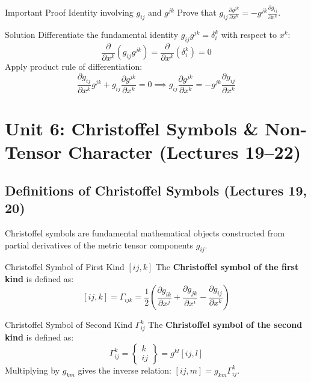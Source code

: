 \documentclass[11pt,a4paper]{article}
\begin{document}
\begin{examplebox}{\texorpdfstring{Important Proof Identity involving $g_{ij}$ and $g^{jk}$}{Important Proof Identity involving g\_ij and g\^{}jk}}
Prove that $g_{ij} \frac{\partial g^{jk}}{\partial x^k} = - g^{jk} \frac{\partial g_{ij}}{\partial x^k}$.
\end{examplebox}
\begin{proofbox}{Solution}
Differentiate the fundamental identity $g_{ij} g^{jk} = \delta^k_i$ with respect to $x^k$:
\[
\frac{\partial}{\partial x^k} \left( g_{ij} g^{jk} \right) = \frac{\partial}{\partial x^k} \left( \delta^k_i \right) = 0
\]
Apply product rule of differentiation:
\[
\frac{\partial g_{ij}}{\partial x^k} g^{jk} + g_{ij} \frac{\partial g^{jk}}{\partial x^k} = 0 \implies g_{ij} \frac{\partial g^{jk}}{\partial x^k} = - g^{jk} \frac{\partial g_{ij}}{\partial x^k}
\]
\end{proofbox}

\newpage
\section{Unit 6: Christoffel Symbols \& Non-Tensor Character (Lectures 19--22)}

\subsection{Definitions of Christoffel Symbols (Lectures 19, 20)}
Christoffel symbols are fundamental mathematical objects constructed from partial derivatives of the metric tensor components $g_{ij}$.

\begin{definitionbox}{Christoffel Symbol of First Kind $[ij, k]$}
The \textbf{Christoffel symbol of the first kind} is defined as:
\[
[ij, k] = \Gamma_{ijk} = \frac{1}{2} \left( \frac{\partial g_{ik}}{\partial x^j} + \frac{\partial g_{jk}}{\partial x^i} - \frac{\partial g_{ij}}{\partial x^k} \right)
\]
\end{definitionbox}

\begin{definitionbox}{Christoffel Symbol of Second Kind $\Gamma^k_{ij}$}
The \textbf{Christoffel symbol of the second kind} is defined as:
\[
\Gamma^k_{ij} = \left\{ \begin{array}{c} k \\ ij \end{array} \right\} = g^{kl} [ij, l]
\]
Multiplying by $g_{km}$ gives the inverse relation: $[ij, m] = g_{km} \Gamma^k_{ij}$.
\end{definitionbox}
\end{document}

